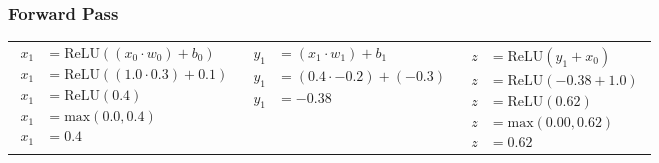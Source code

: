 \documentclass[12pt, a4paper]{article}
\begin{document}
            \subsubsection{Forward Pass}
                \begin{table}[h]
                    \centering
                    \begin{tabular}{c|c|c}
                        $\begin{aligned}
                            {x}_{1} &= \text{ReLU}(({x}_{0} \cdot {w}_{0}) + {b}_{0}) \\
                            {x}_{1} &= \text{ReLU}((1.0 \cdot 0.3) + 0.1) \\
                            {x}_{1} &= \text{ReLU}(0.4) \\
                            {x}_{1} &= \text{max}(0.0, 0.4) \\
                            {x}_{1} &= 0.4
                        \end{aligned}$
                        &
                        $\begin{aligned}
                            {y}_{1} &= ({x}_{1} \cdot {w}_{1}) + {b}_{1} \\
                            {y}_{1} &= (0.4 \cdot -0.2) + (-0.3) \\
                            {y}_{1} &= -0.38
                        \end{aligned}$
                        &
                        $\begin{aligned}
                            z &= \text{ReLU}({y}_{1} + {x}_{0}) \\
                            z &= \text{ReLU}(-0.38 + 1.0) \\
                            z &= \text{ReLU}(0.62) \\
                            z &= \text{max}(0.00, 0.62) \\
                            z &= 0.62
                        \end{aligned}$
                        \\
                    \end{tabular}
                \end{table}
\end{document}
